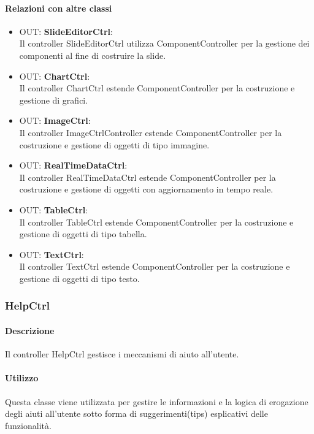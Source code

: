 	\paragraph{Relazioni con altre classi}
	\begin{itemize}
	 \item OUT: \textbf{SlideEditorCtrl}:\\
		Il controller SlideEditorCtrl utilizza ComponentController per la gestione dei componenti al fine di costruire la slide.
	 \item OUT: \textbf{ChartCtrl}:\\
	 	Il controller ChartCtrl estende ComponentController per la costruzione e gestione di grafici.
	 \item OUT: \textbf{ImageCtrl}:\\
		Il controller ImageCtrlController estende ComponentController per la costruzione e gestione di oggetti di tipo immagine.
	 \item OUT: \textbf{RealTimeDataCtrl}:\\
		Il controller RealTimeDataCtrl estende ComponentController per la costruzione e gestione di oggetti con aggiornamento in tempo reale.
	 \item OUT: \textbf{TableCtrl}:\\
		Il controller TableCtrl estende ComponentController per la costruzione e gestione di oggetti di tipo tabella.
	 \item OUT: \textbf{TextCtrl}:\\
		Il controller TextCtrl estende ComponentController per la costruzione e gestione di oggetti di tipo testo.
	
	\end{itemize}
\newpage
\subsubsection{HelpCtrl}
      \paragraph{Descrizione}
	Il controller HelpCtrl gestisce i meccanismi di aiuto all'utente.
	
	\paragraph{Utilizzo}
	Questa classe viene utilizzata per gestire le informazioni e la logica di erogazione degli aiuti all'utente sotto forma di suggerimenti(tips) esplicativi delle funzionalità.
	
